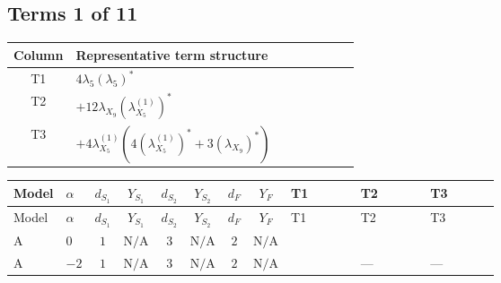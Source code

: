 \documentclass[8pt]{article}
\begin{document}
\begin{landscape}
\subsection*{Terms 1 of 11}
\begin{center}
\begin{tabular}{@{}c >{\raggedright\arraybackslash}p{0.82\linewidth}@{}}
\toprule
Column & Representative term structure \\
\midrule
T1 & \(\displaystyle 4 {\lambda_5} \left({\lambda_5}\right)^{*}\) \\
\midrule
T2 & \(\displaystyle +12 {\lambda_{X_{9}}} \left({\lambda_{X_{5}}^{(1)}}\right)^{*}\) \\
\midrule
T3 & \(\displaystyle +4 {\lambda_{X_{5}}^{(1)}} (4 \left({\lambda_{X_{5}}^{(1)}}\right)^{*}+3 \left({\lambda_{X_{9}}}\right)^{*})\) \\
\midrule
\bottomrule
\end{tabular}
\end{center}
\smallskip
\tiny
\begin{longtable}{@{}llcccccc >{\raggedright\arraybackslash}p{0.21\linewidth} >{\raggedright\arraybackslash}p{0.21\linewidth} >{\raggedright\arraybackslash}p{0.21\linewidth}@{}}
\toprule
Model & $\alpha$ & $d_{S_1}$ & $Y_{S_1}$ & $d_{S_2}$ & $Y_{S_2}$ & $d_F$ & $Y_F$ & T1 & T2 & T3 \\
\midrule
\endfirsthead
\toprule
Model & $\alpha$ & $d_{S_1}$ & $Y_{S_1}$ & $d_{S_2}$ & $Y_{S_2}$ & $d_F$ & $Y_F$ & T1 & T2 & T3 \\
\midrule
\endhead
A & $0$ & $1$ & $\text{N/A}$ & $3$ & $\text{N/A}$ & $2$ & $\text{N/A}$ & \scriptsize\adjustbox{max width=\linewidth}{$\begin{gathered} 4 {\lambda_5} \left({\lambda_5}\right)^{*}\end{gathered}$} & \scriptsize\adjustbox{max width=\linewidth}{$\begin{gathered} +12 {\lambda_{X_{9}}} \left({\lambda_{X_{5}}^{(1)}}\right)^{*}\end{gathered}$} & \scriptsize\adjustbox{max width=\linewidth}{$\begin{gathered} +4 {\lambda_{X_{5}}^{(1)}} (4 \left({\lambda_{X_{5}}^{(1)}}\right)^{*}+3 \left({\lambda_{X_{9}}}\right)^{*})\end{gathered}$} \\
\midrule
A & $-2$ & $1$ & $\text{N/A}$ & $3$ & $\text{N/A}$ & $2$ & $\text{N/A}$ & \scriptsize\adjustbox{max width=\linewidth}{$\begin{gathered} 4 {\lambda_5} \left({\lambda_5}\right)^{*}\end{gathered}$} & --- & --- \\

\end{longtable}
\end{landscape}
\end{document}
